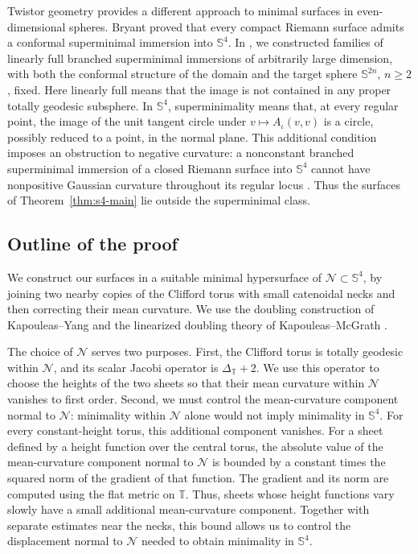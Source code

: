 \documentclass[a4paper,11pt,oneside,reqno]{amsart}
\numberwithin{equation}{section}
\theoremstyle{definition}
\begin{document}
Twistor geometry provides a different approach to minimal
surfaces in even-dimensional spheres. Bryant
\cite{BryantMinimalS4} proved that every compact Riemann
surface admits a conformal superminimal immersion into
$\mathbb{S}^4$. In \cite{CaniatoHighDimensionalFamilies},
we constructed families of linearly full branched
superminimal immersions of arbitrarily large dimension,
with both the conformal structure of the domain and the
target sphere $\mathbb{S}^{2n}$, $n\geq2$, fixed.
Here linearly full means that the image is not contained
in any proper totally geodesic subsphere.
In $\mathbb{S}^4$, superminimality means that, at every
regular point, the image of the unit tangent circle under
$v\mapsto A_\iota(v,v)$ is a circle, possibly reduced
to a point, in the normal plane.
This additional condition imposes an obstruction to
negative curvature: a nonconstant branched superminimal
immersion of a closed Riemann surface into
$\mathbb{S}^4$ cannot have nonpositive Gaussian curvature
throughout its regular locus
\cite[Remark~1.4]{CaniatoHighDimensionalFamilies}.
Thus the surfaces of Theorem~\ref{thm:s4-main} lie outside
the superminimal class.
%
\subsection{Outline of the proof}
%
We construct our surfaces in a suitable minimal hypersurface of $\mathcal{N}\subset\mathbb{S}^4$, by joining two nearby copies of the Clifford torus with small catenoidal necks and then correcting their mean curvature. We use the doubling construction of Kapouleas--Yang \cite{KapouleasYangClifford} and the linearized doubling theory of Kapouleas--McGrath \cite{KapouleasMcGrathLD}.

The choice of $\mathcal N$ serves two purposes.
First, the Clifford torus is totally geodesic within
$\mathcal N$, and its scalar Jacobi operator is
$\Delta_{\mathbb T}+2$. We use this operator to
choose the heights of the two sheets so that their
mean curvature within $\mathcal N$ vanishes to
first order. Second, we must control the mean-curvature component
normal to $\mathcal N$: minimality within $\mathcal N$
alone would not imply minimality in $\mathbb S^4$.
For every constant-height torus, this additional
component vanishes. For a sheet defined by a height function over the
central torus, the absolute value of the
mean-curvature component normal to $\mathcal N$
is bounded by a constant times the squared norm
of the gradient of that function. The gradient
and its norm are computed using the flat metric
on $\mathbb T$. Thus, sheets whose height functions vary slowly
have a small additional mean-curvature component.
Together with separate estimates near the necks,
this bound allows us to control the displacement
normal to $\mathcal N$ needed to obtain minimality
in $\mathbb S^4$.
\end{document}
